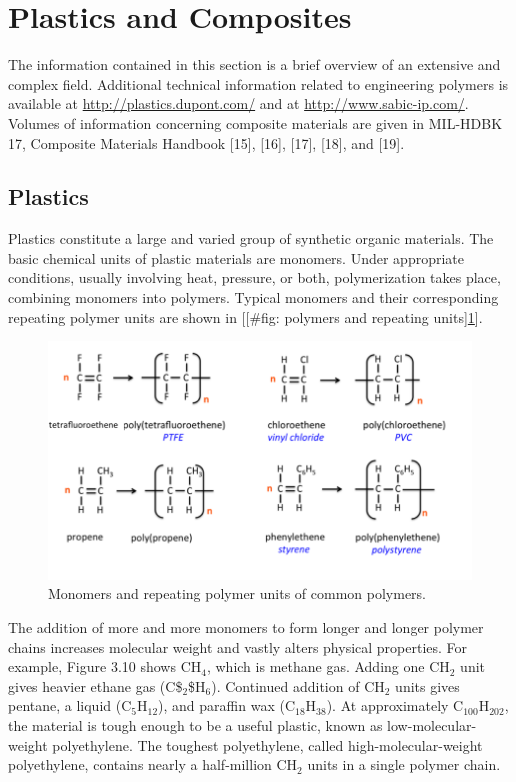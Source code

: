 \documentclass[a4paper,openany,12pt]{book}
\begin{document}
\section{Plastics and Composites}
\label{sec:orga1682b9}
The information contained in this section is a brief overview of an
extensive and complex field. Additional technical information related to
engineering polymers is available at \url{http://plastics.dupont.com/} and
at \url{http://www.sabic-ip.com/}. Volumes of information concerning
composite materials are given in MIL-HDBK 17, Composite Materials
Handbook [15], [16], [17], [18], and [19].

\subsection{Plastics}
\label{sec:org59422ef}
Plastics constitute a large and varied group of synthetic organic
materials. The basic chemical units of plastic materials are monomers.
Under appropriate conditions, usually involving heat, pressure, or both,
polymerization takes place, combining monomers into polymers. Typical
monomers and their corresponding repeating polymer units are shown in
[[\#fig: polymers and repeating units]\ref{fig:org455ccb8}].


\cite{secondaryscience4all}
\begin{figure}[htbp]
\centering
\includegraphics[width=.9\linewidth]{pictures/Material-selection/polymer.png}
\caption{\label{fig:org455ccb8}
Monomers and repeating polymer units of common polymers.}
\end{figure}

The addition of more and more monomers to form longer and longer polymer
chains increases molecular weight and vastly alters physical properties.
For example, Figure 3.10 shows \(\text{CH}_4\), which is methane gas.
Adding one \(\text{CH}_2\) unit gives heavier ethane gas (C\$\(_{\text{2}}\)\$H\(_6\)).
Continued addition of \(\text{CH}_2\) units gives pentane, a liquid
(\(\text{C}_5\text{H}_{12}\)), and paraffin wax
(\(\text{C}_{18}\text{H}_{38}\)). At approximately
\(\text{C}_{100}\text{H}_{202}\), the material is tough enough to be a
useful plastic, known as low-molecular-weight polyethylene. The toughest
polyethylene, called high-molecular-weight polyethylene, contains nearly
a half-million \(\text{CH}_2\) units in a single polymer chain.
\end{document}
